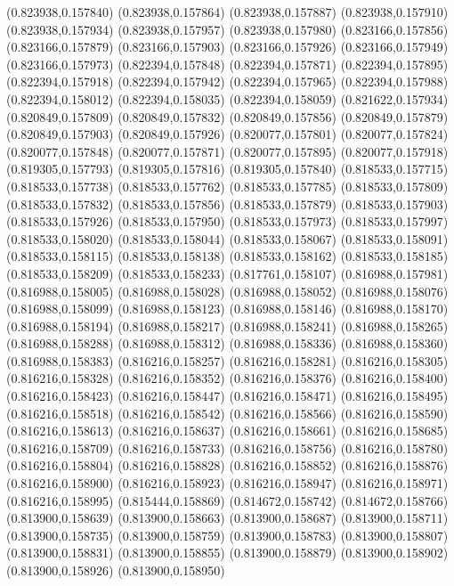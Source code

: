 (0.823938,0.157840)
(0.823938,0.157864)
(0.823938,0.157887)
(0.823938,0.157910)
(0.823938,0.157934)
(0.823938,0.157957)
(0.823938,0.157980)
(0.823166,0.157856)
(0.823166,0.157879)
(0.823166,0.157903)
(0.823166,0.157926)
(0.823166,0.157949)
(0.823166,0.157973)
(0.822394,0.157848)
(0.822394,0.157871)
(0.822394,0.157895)
(0.822394,0.157918)
(0.822394,0.157942)
(0.822394,0.157965)
(0.822394,0.157988)
(0.822394,0.158012)
(0.822394,0.158035)
(0.822394,0.158059)
(0.821622,0.157934)
(0.820849,0.157809)
(0.820849,0.157832)
(0.820849,0.157856)
(0.820849,0.157879)
(0.820849,0.157903)
(0.820849,0.157926)
(0.820077,0.157801)
(0.820077,0.157824)
(0.820077,0.157848)
(0.820077,0.157871)
(0.820077,0.157895)
(0.820077,0.157918)
(0.819305,0.157793)
(0.819305,0.157816)
(0.819305,0.157840)
(0.818533,0.157715)
(0.818533,0.157738)
(0.818533,0.157762)
(0.818533,0.157785)
(0.818533,0.157809)
(0.818533,0.157832)
(0.818533,0.157856)
(0.818533,0.157879)
(0.818533,0.157903)
(0.818533,0.157926)
(0.818533,0.157950)
(0.818533,0.157973)
(0.818533,0.157997)
(0.818533,0.158020)
(0.818533,0.158044)
(0.818533,0.158067)
(0.818533,0.158091)
(0.818533,0.158115)
(0.818533,0.158138)
(0.818533,0.158162)
(0.818533,0.158185)
(0.818533,0.158209)
(0.818533,0.158233)
(0.817761,0.158107)
(0.816988,0.157981)
(0.816988,0.158005)
(0.816988,0.158028)
(0.816988,0.158052)
(0.816988,0.158076)
(0.816988,0.158099)
(0.816988,0.158123)
(0.816988,0.158146)
(0.816988,0.158170)
(0.816988,0.158194)
(0.816988,0.158217)
(0.816988,0.158241)
(0.816988,0.158265)
(0.816988,0.158288)
(0.816988,0.158312)
(0.816988,0.158336)
(0.816988,0.158360)
(0.816988,0.158383)
(0.816216,0.158257)
(0.816216,0.158281)
(0.816216,0.158305)
(0.816216,0.158328)
(0.816216,0.158352)
(0.816216,0.158376)
(0.816216,0.158400)
(0.816216,0.158423)
(0.816216,0.158447)
(0.816216,0.158471)
(0.816216,0.158495)
(0.816216,0.158518)
(0.816216,0.158542)
(0.816216,0.158566)
(0.816216,0.158590)
(0.816216,0.158613)
(0.816216,0.158637)
(0.816216,0.158661)
(0.816216,0.158685)
(0.816216,0.158709)
(0.816216,0.158733)
(0.816216,0.158756)
(0.816216,0.158780)
(0.816216,0.158804)
(0.816216,0.158828)
(0.816216,0.158852)
(0.816216,0.158876)
(0.816216,0.158900)
(0.816216,0.158923)
(0.816216,0.158947)
(0.816216,0.158971)
(0.816216,0.158995)
(0.815444,0.158869)
(0.814672,0.158742)
(0.814672,0.158766)
(0.813900,0.158639)
(0.813900,0.158663)
(0.813900,0.158687)
(0.813900,0.158711)
(0.813900,0.158735)
(0.813900,0.158759)
(0.813900,0.158783)
(0.813900,0.158807)
(0.813900,0.158831)
(0.813900,0.158855)
(0.813900,0.158879)
(0.813900,0.158902)
(0.813900,0.158926)
(0.813900,0.158950)
